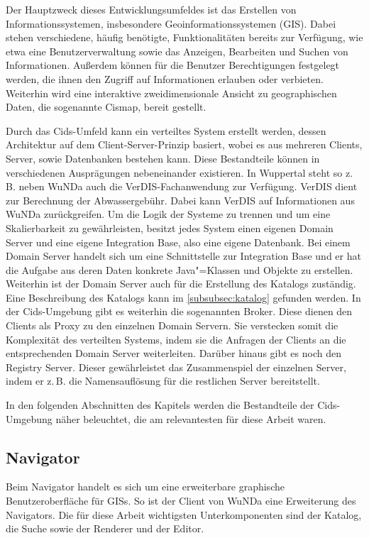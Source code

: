 Der Hauptzweck dieses Entwicklungsumfeldes ist das Erstellen von Informationssystemen, insbesondere Geoinformationssystemen (\acs{GIS}).
Dabei stehen verschiedene, häufig benötigte, Funktionalitäten bereits zur Verfügung, wie etwa eine Benutzerverwaltung sowie das Anzeigen, Bearbeiten und Suchen von Informationen.
Außerdem können für die Benutzer Berechtigungen festgelegt werden, die ihnen den Zugriff auf Informationen erlauben oder verbieten.
Weiterhin wird eine interaktive zweidimensionale Ansicht zu geographischen Daten, die sogenannte Cismap, bereit gestellt.

Durch das Cids-Umfeld kann ein verteiltes System erstellt werden, dessen Architektur auf dem Client-Server-Prinzip basiert, wobei es aus mehreren Clients, Server, sowie Datenbanken bestehen kann.
Diese Bestandteile können in verschiedenen Ausprägungen nebeneinander existieren.
In Wuppertal steht so z.\,B. neben \ac{WuNDa} auch die VerDIS-Fachanwendung zur Verfügung. VerDIS dient zur Berechnung der Abwassergebühr.
Dabei kann VerDIS auf Informationen aus \ac{WuNDa} zurückgreifen.
Um die Logik der Systeme zu trennen und um eine Skalierbarkeit zu gewährleisten, besitzt jedes System einen eigenen Domain Server und eine eigene Integration Base, also eine eigene Datenbank.
Bei einem Domain Server handelt sich um eine Schnittstelle zur Integration Base und er hat die Aufgabe aus deren Daten konkrete Java"=Klassen und Objekte zu erstellen. Weiterhin ist der Domain Server auch für die Erstellung des Katalogs zuständig.
Eine Beschreibung des Katalogs kann im \autoref{subsubsec:katalog} gefunden werden.
In der Cids-Umgebung gibt es weiterhin die sogenannten Broker. Diese dienen den Clients als Proxy zu den einzelnen Domain Servern. Sie verstecken somit die Komplexität des verteilten Systems, indem sie die Anfragen der Clients an die entsprechenden Domain Server weiterleiten.
Darüber hinaus gibt es noch den Registry Server. Dieser gewährleistet das Zusammenspiel der einzelnen Server, indem er z.\,B. die Namensauflösung für die restlichen Server bereitstellt.

In den folgenden Abschnitten des Kapitels werden die Bestandteile der Cids-Umgebung näher beleuchtet, die am relevantesten für diese Arbeit waren.

\subsection{Navigator}
Beim Navigator handelt es sich um eine erweiterbare graphische Benutzeroberfläche für \acp{GIS}. So ist der Client von \ac{WuNDa} eine Erweiterung des Navigators. Die für diese Arbeit wichtigsten Unterkomponenten sind der Katalog, die Suche sowie der Renderer und der Editor.

